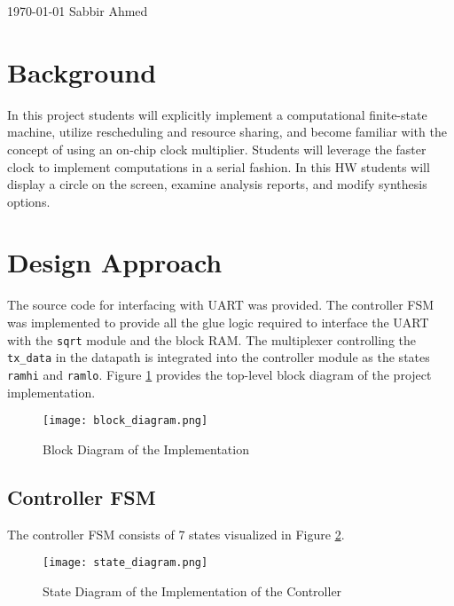 \documentclass[paper=usletter, fontsize=12pt]{article}
\begin{document}
    {\today} {Sabbir Ahmed}
    \vspace{-0.1in}

    \section{Background} In this project students will explicitly implement a
    computational finite-state machine, utilize rescheduling and resource
    sharing, and become familiar with the concept of using an on-chip clock
    multiplier. Students will leverage the faster clock to implement
    computations in a serial fashion. In this HW students will display a circle
    on the screen, examine analysis reports, and modify synthesis options.

    \section{Design Approach} The source code for interfacing with UART was
    provided. The controller FSM was implemented to provide all the glue logic
    required to interface the UART with the \texttt{sqrt} module and the block
    RAM. The multiplexer controlling the \texttt{tx\_data} in the datapath is
    integrated into the controller module as the states \texttt{ramhi} and
    \texttt{ramlo}. Figure \ref{fig:block} provides the top-level block diagram
    of the project implementation.

        \begin{figure}[ht]
            \begin{center}
                \texttt{[image: block\_diagram.png]}
                \caption{Block Diagram of the Implementation}
                \label{fig:block}
            \end{center}
        \end{figure}

        \subsection{Controller FSM} The controller FSM consists of 7 states
        visualized in Figure \ref{fig:states}.

            \begin{figure}[ht]
                \begin{center}
                    \texttt{[image: state\_diagram.png]}
                    \caption{State Diagram of the Implementation of the
                    Controller}
                    \label{fig:states}
                \end{center}
            \end{figure}
\end{document}
